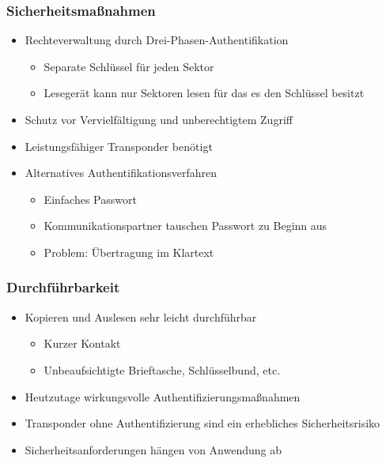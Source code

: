 \documentclass{beamer}
\begin{document}
\begin{frame}
\frametitle{Sicherheitsmaßnahmen}

\begin{itemize}
	\item Rechteverwaltung durch Drei-Phasen-Authentifikation
	\begin{itemize}
		\item Separate Schlüssel für jeden Sektor
		\item Lesegerät kann nur Sektoren lesen für das es den Schlüssel besitzt
	\end{itemize}
	\item Schutz vor Vervielfältigung und unberechtigtem Zugriff
	\item Leistungsfähiger Transponder benötigt
	\item Alternatives Authentifikationsverfahren
	\begin{itemize}
		\item Einfaches Passwort
		\item Kommunikationspartner tauschen Passwort zu Beginn aus
		\item Problem: Übertragung im Klartext
	\end{itemize}
\end{itemize}
\end{frame}


\begin{frame}
\frametitle{Durchführbarkeit}

\begin{itemize}
	\item Kopieren und Auslesen sehr leicht durchführbar
	\begin{itemize}
		\item Kurzer Kontakt
		\item Unbeaufsichtigte Brieftasche, Schlüsselbund, etc.
	\end{itemize}
	\item Heutzutage wirkungsvolle Authentifizierungsmaßnahmen
	\item Transponder ohne Authentifizierung sind ein erhebliches Sicherheitsrisiko
	\item Sicherheitsanforderungen hängen von Anwendung ab
\end{itemize}
\end{frame}
\end{document}
